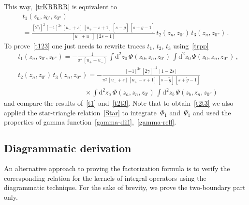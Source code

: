 \documentclass[a4paper,11pt]{article}
\numberwithin{equation}{section}
\begin{document}
This way,~\eqref{trKRRRR} is equivalent to
\begin{multline} \label{t123}
	t_1(z_n, z_{0'}, z_{0''}) \\
	=
	\frac{[2\tilde{\gamma}]^2\,[-1]^{2s}\,[u_-+s]\,[u_+-s+1]\,[s-\tilde{g}]\,[s+\tilde{g}-1]}{[u_++u_-]\,[2s-1]} \,
	t_2(z_n, z_{0'}) \, t_3(z_n, z_{0''}) \,.
\end{multline}
To prove~\eqref{t123} one just needs to rewrite traces $t_1$, $t_2$, $t_3$ using~\eqref{trpp}
\begin{align}
	& \label{t1}
	t_1(z_n, z_{0'}, z_{0''}) =
	-\frac{1}{\pi^2\,[u_++u_-]} \,
	\int \mathrm{d}^2z_0 \, \Phi(z_0, z_n, z_{0'}) \, \int \mathrm{d}^2z_0 \, \Psi(z_0, z_n, z_{0''}) \,, \\
	& \nonumber
	t_2(z_n, z_{0'}) \, t_3(z_n, z_{0''}) =
	-\frac{[-1]^{2s}\,[2\tilde{\gamma}]^{-2}\,[1-2s]}{\pi^2\,[u_-+s]\,[u_+-s+1]\,[s-\tilde{g}]\,[s+\tilde{g}-1]} \\
	& \label{t2t3}
	\qquad\qquad\qquad\qquad\quad\;\;\; \times
	\int \mathrm{d}^2z_a \, \Phi(z_a, z_n, z_{0'}) \, \int \mathrm{d}^2z_b \, \Psi(z_b, z_n, z_{0''})
\end{align}
and compare the results of~\eqref{t1} and~\eqref{t2t3}.
Note that to obtain~\eqref{t2t3} we also applied the star-triangle relation~\eqref{Star} to integrate~$\Phi_1$ and~$\Psi_1$ and used the properties of gamma function~\eqref{gamma-diff},~\eqref{gamma-refl}.

\subsection{Diagrammatic derivation}

An alternative approach to proving the factorization formula is to verify the corresponding relation for the kernels of integral operators using the diagrammatic technique. For the sake of brevity, we prove the two-boundary part only.
\end{document}
